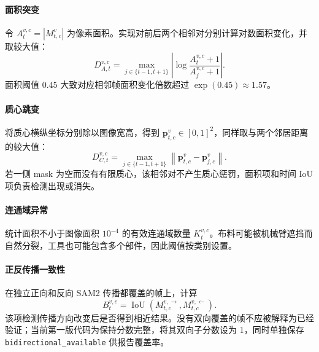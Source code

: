 \documentclass[UTF8,a4paper,11pt]{ctexart}
\newcommand{\norm}[1]{\left\lVert #1 \right\rVert}
\begin{document}
\paragraph{面积突变}
令 $A_t^{v,c}=|M_{t,c}^{v}|$ 为像素面积。实现对前后两个相邻对分别计算对数面积变化，并取较大值：
\begin{equation}
D_{A,t}^{v,c}=\max_{j\in\{t-1,t+1\}}
\left|\log\frac{A_t^{v,c}+1}{A_j^{v,c}+1}\right|.
\end{equation}
面积阈值 $0.45$ 大致对应相邻帧面积变化倍数超过 $\exp(0.45)\approx1.57$。

\paragraph{质心跳变}
将质心横纵坐标分别除以图像宽高，得到 $\bm p_{t,c}^{v}\in[0,1]^2$，同样取与两个邻居距离的较大值：
\begin{equation}
D_{C,t}^{v,c}=\max_{j\in\{t-1,t+1\}}
\norm{\bm p_{t,c}^{v}-\bm p_{j,c}^{v}}.
\end{equation}
若一侧 mask 为空而没有有限质心，该相邻对不产生质心惩罚，面积项和时间 IoU 项负责检测出现或消失。

\paragraph{连通域异常}
统计面积不小于图像面积 $10^{-4}$ 的有效连通域数量 $K_t^{v,c}$。布料可能被机械臂遮挡而自然分裂，工具也可能包含多个部件，因此阈值按类别设置。

\paragraph{正反传播一致性}
在独立正向和反向 SAM2 传播都覆盖的帧上，计算
\begin{equation}
B_t^{v,c}=\operatorname{IoU}(M_{t,c}^{v,\rightarrow},M_{t,c}^{v,\leftarrow}).
\end{equation}
该项检测传播方向改变后是否得到相近结果。没有双向覆盖的帧不应被解释为已经验证；当前第一版代码为保持分数完整，将其双向子分数设为 1，同时单独保存 \texttt{bidirectional\_available} 供报告覆盖率。
\end{document}
